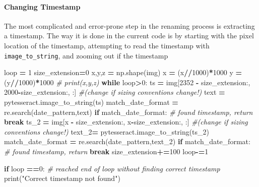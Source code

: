 \documentclass[
]{article}
\newenvironment{Shaded}{\begin{snugshade}}{\end{snugshade}}
\newcommand{\BuiltInTok}[1]{#1}
\newcommand{\CommentTok}[1]{\textcolor[rgb]{0.56,0.35,0.01}{\textit{#1}}}
\newcommand{\ControlFlowTok}[1]{\textcolor[rgb]{0.13,0.29,0.53}{\textbf{#1}}}
\newcommand{\DecValTok}[1]{\textcolor[rgb]{0.00,0.00,0.81}{#1}}
\newcommand{\NormalTok}[1]{#1}
\newcommand{\OperatorTok}[1]{\textcolor[rgb]{0.81,0.36,0.00}{\textbf{#1}}}
\newcommand{\StringTok}[1]{\textcolor[rgb]{0.31,0.60,0.02}{#1}}
\begin{document}
\hypertarget{changing-timestamp}{%
\paragraph{Changing Timestamp}\label{changing-timestamp}}

The most complicated and error-prone step in the renaming process is extracting a timestamp. The way it is done in the current code is by starting with the pixel location of the timestamp, attempting to read the timestamp with \texttt{image\_to\_string}, and zooming out if the timestamp

\begin{Shaded}
\begin{Highlighting}[]
\NormalTok{    loop }\OperatorTok{=} \DecValTok{1}
\NormalTok{    size\_extension}\OperatorTok{=}\DecValTok{0}
\NormalTok{    x,y,z }\OperatorTok{=}\NormalTok{ np.shape(img)}
\NormalTok{    x }\OperatorTok{=}\NormalTok{ (x}\OperatorTok{//}\DecValTok{1000}\NormalTok{)}\OperatorTok{*}\DecValTok{1000}
\NormalTok{    y }\OperatorTok{=}\NormalTok{ (y}\OperatorTok{//}\DecValTok{1000}\NormalTok{)}\OperatorTok{*}\DecValTok{1000}
    \CommentTok{\# print(x,y,z)}
    \ControlFlowTok{while}\NormalTok{ loop}\OperatorTok{\textgreater{}}\DecValTok{0}\NormalTok{:}
\NormalTok{      ts }\OperatorTok{=}\NormalTok{ img[}\DecValTok{2352} \OperatorTok{{-}}\NormalTok{ size\_extension:, }\DecValTok{2000}\OperatorTok{{-}}\NormalTok{size\_extension:, :] }\CommentTok{\#(change if sizing conventions change!)}
\NormalTok{      text }\OperatorTok{=}\NormalTok{ pytesseract.image\_to\_string(ts)}
\NormalTok{      match\_date\_format }\OperatorTok{=}\NormalTok{ re.search(date\_pattern,text)}
      \ControlFlowTok{if}\NormalTok{ match\_date\_format:}
        \CommentTok{\# found timestamp, return}
        \ControlFlowTok{break}
\NormalTok{      ts\_2 }\OperatorTok{=}\NormalTok{ img[x }\OperatorTok{{-}}\NormalTok{ size\_extension:, x}\OperatorTok{{-}}\NormalTok{size\_extension:, :] }\CommentTok{\#(change if sizing conventions change!)}
\NormalTok{      text\_2}\OperatorTok{=}\NormalTok{ pytesseract.image\_to\_string(ts\_2)}
\NormalTok{      match\_date\_format }\OperatorTok{=}\NormalTok{ re.search(date\_pattern,text\_2)}
      \ControlFlowTok{if}\NormalTok{ match\_date\_format:}
        \CommentTok{\# found timestamp, return}
        \ControlFlowTok{break}
\NormalTok{      size\_extension}\OperatorTok{+=}\DecValTok{100}
\NormalTok{      loop}\OperatorTok{{-}=}\DecValTok{1}

    \ControlFlowTok{if}\NormalTok{ loop }\OperatorTok{==}\DecValTok{0}\NormalTok{:      }
      \CommentTok{\# reached end of loop without finding correct timestamp}
      \BuiltInTok{print}\NormalTok{(}\StringTok{"Correct timestamp not found"}\NormalTok{)}
\end{Highlighting}
\end{Shaded}
\end{document}
